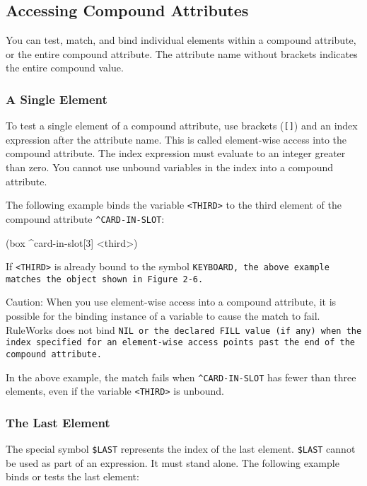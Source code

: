 \subsection{Accessing Compound Attributes}

You can test, match, and bind individual elements within a compound
attribute, or the entire compound attribute.  The attribute name
without brackets indicates the entire compound value.

\subsubsection{A Single Element}

To test a single element of a compound attribute, use brackets
(\verb|[]|) and an index expression after the attribute name. This is
called element-wise access into the compound attribute. The index
expression must evaluate to an integer greater than zero. You cannot
use unbound variables in the index into a compound attribute.

The following example binds the variable \verb|<THIRD>| to the third
element of the compound attribute \verb|^CARD-IN-SLOT|:
\begin{qv}
(box ^card-in-slot[3] <third>)
\end{qv}

If \verb|<THIRD>| is already bound to the symbol \tt{KEYBOARD}, the
above example matches the object shown in Figure 2-6.

Caution: When you use element-wise access into a compound attribute,
it is possible for the binding instance of a variable to cause the
match to fail.  RuleWorks does not bind \tt{NIL} or the declared
\tt{FILL} value (if any) when the index specified for an element-wise
access points past the end of the compound attribute.

In the above example, the match fails when \verb|^CARD-IN-SLOT| has
fewer than three elements, even if the variable \verb|<THIRD>| is
unbound.

\subsubsection{The Last Element}

  The special symbol \verb|$LAST| represents the index of the
  last element. \verb|$LAST| cannot be used as part of an
  expression. It must stand alone. The following example
  binds or tests the last element:

